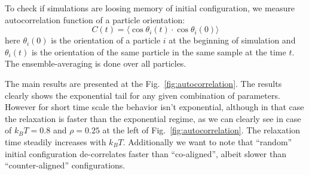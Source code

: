 To check if simulations are loosing memory of initial configuration, we measure autocorrelation function of a particle orientation:
\begin{equation}
\label{eq:autocorrelation_ld}
	C(t) = \langle\cos\theta_i(t) \cdot \cos\theta_i(0)\rangle
\end{equation}
here $\theta_i(0)$ is the orientation of a particle $i$ at the beginning of simulation and $\theta_i(t)$ is the orientation of the same particle in the same sample at the time $t$. The ensemble-averaging is done over all particles.

The main results are presented at the Fig.~\ref{fig:autocorrelation}. The results clearly shows the exponential tail for any given combination of parameters. However for short time scale the behavior isn't exponential, although in that case the relaxation is faster than the exponential regime, as we can clearly see in case of $k_BT = 0.8$ and $\rho = 0.25$ at the left of Fig.~\ref{fig:autocorrelation}. The relaxation time steadily increases with $k_BT$. Additionally we want to note that ``random'' initial configuration de-correlates faster than ``co-aligned'', albeit slower than ``counter-aligned'' configurations.

